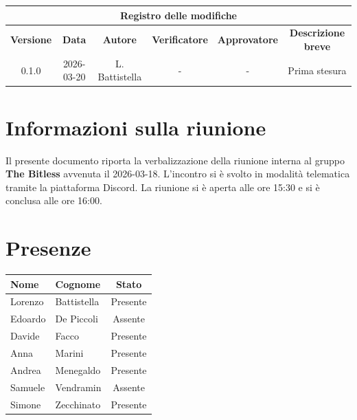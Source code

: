 \documentclass[a4paper, 10pt, colorlinks=true, linkcolor=black, urlcolor=blue, citecolor=blue, hidelinks]{article}
\begin{document}
\newcommand{\tipoverbale}{interno}
\newcommand{\dataverbale}{2026-03-18}
\newcommand{\dataversione}{2026-03-20}
\newcommand{\versione}{0.1.0}
\newcommand{\stato}{Revisione}
\newcommand{\destinatari}{The Bitless, prof. Tullio Vardanega, prof. Riccardo Cardin}

\begin{titlepage}

\end{titlepage}

\newpage
{}

\begin{center}
    \begin{tabular}{|c|c|c|c|c|c|}
        \hline
        \multicolumn{6}{|c|}{\textbf{Registro delle modifiche}} \\
        \hline
        \textbf{Versione} & \textbf{Data} & \textbf{Autore} & \textbf{Verificatore} & \textbf{Approvatore} & \textbf{Descrizione breve} \\
        \hline 
        0.1.0 & 2026-03-20 & L. Battistella & - & - & Prima stesura \\
        \hline
    \end{tabular}
\end{center}

\newpage
\tableofcontents 

\newpage
\section{Informazioni sulla riunione}
Il presente documento riporta la verbalizzazione della riunione interna al gruppo \textbf{The Bitless} avvenuta il \dataverbale{}. L'incontro si è svolto in modalità telematica tramite la piattaforma Discord. La riunione si è aperta alle ore 15:30 e si è conclusa alle ore 16:00.

\section{Presenze}
\begin{center}
\begin{tabular}{|l|l|c|}
\hline
\textbf{Nome} & \textbf{Cognome} & \textbf{Stato} \\
\hline
Lorenzo & Battistella & Presente \\
Edoardo & De Piccoli & Assente \\
Davide & Facco & Presente \\
Anna & Marini & Presente \\
Andrea & Menegaldo & Presente \\
Samuele & Vendramin & Assente \\
Simone & Zecchinato & Presente \\
\hline
\end{tabular}
\end{center}
\end{document}
